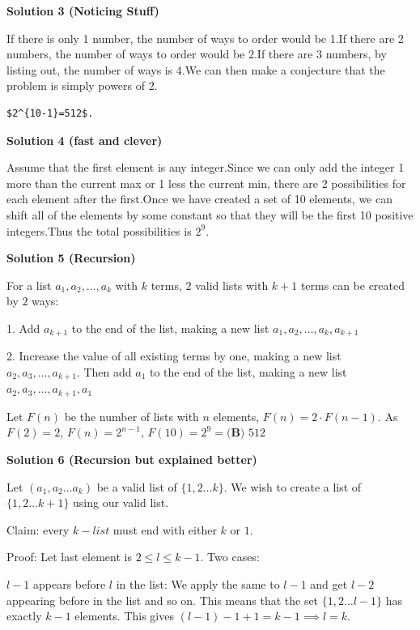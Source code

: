 \begin{enumerate}
\textbf{Solution 3 (Noticing Stuff)}

If there is only 1 number, the number of ways to order would be 1.If there are 2 numbers, the number of ways to order would be 2.If there are 3 numbers, by listing out, the number of ways is 4.We can then make a conjecture that the problem is simply powers of 2. 

 \begin{verbatim}
$2^{10-1}=512$.
\end{verbatim}





\textbf{Solution 4 (fast and clever)}

Assume that the first element is any integer.Since we can only add the integer 1 more than the current max or 1 less the current min, there are 2 possibilities for each element after the first.Once we have created a set of 10 elements, we can shift all of the elements by some constant so that they will be the first 10 positive integers.Thus the total possibilities is $2^9$.

 



\textbf{Solution 5 (Recursion)}

For a list ${a_1, a_2, \dots, a_k}$ with $k$ terms, $2$ valid lists with $k+1$ terms can be created by $2$ ways:

 1. Add $a_{k+1}$ to the end of the list, making a new list ${a_1, a_2, \dots, a_k, a_{k+1} }$

 2. Increase the value of all existing terms by one, making a new list ${a_2, a_3, \dots, a_{k+1}}$. Then add $a_1$ to the end of the list, making a new list ${a_2, a_3, \dots, a_{k+1}, a_1}$

 Let $F(n)$ be the number of lists with $n$ elements, $F(n) = 2 \cdot F(n-1)$. As $F(2) = 2$, $F(n) = 2^{n-1}$, $F(10) = 2^9 = \boxed{\textbf{(B) } 512}$




\textbf{Solution 6 (Recursion but explained better)}

Let $(a_1,a_2 \dots a_k)$ be a valid list of $\{1,2 \dots k\}$. We wish to create a list of $\{1,2 \dots k+1\}$ using our valid list. 

 Claim: every $k-list$ must end with either $k$ or $1$. 

 Proof: Let last element is $2 \leq l \leq k-1$. Two cases:

 $l-1$ appears before $l$ in the list: We apply the same to $l-1$ and get $l-2$ appearing before in the list and so on. This means that the set $\{1,2 \dots l-1\}$ has exactly $k-1$ elements. This gives $(l-1) -1 + 1 = k-1 \implies l = k$. 


\end{enumerate}
